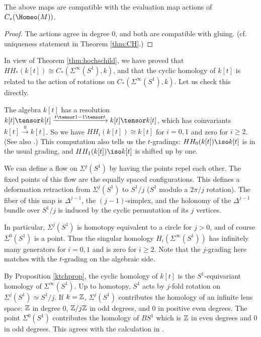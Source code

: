 \begin{prop} \label{ktchprop}
The above maps are compatible with the evaluation map actions of $C_*(\Homeo(M))$.
\end{prop}

\begin{proof}
The actions agree in degree 0, and both are compatible with gluing.
(cf. uniqueness statement in Theorem \ref{thm:CH}.)
\end{proof}

\medskip

In view of Theorem \ref{thm:hochschild}, we have proved that $HH_*(k[t]) \cong C_*(\Sigma^\infty(S^1), k)$,
and that the cyclic homology of $k[t]$ is related to the action of rotations
on $C_*(\Sigma^\infty(S^1), k)$.
Let us check this directly.

The algebra $k[t]$ has a resolution 
$k[t] \tensor k[t] \xrightarrow{t\tensor 1 - 1 \tensor t} k[t] \tensor k[t]$, 
which has coinvariants $k[t] \xrightarrow{0} k[t]$. 
So we have $HH_i(k[t]) \cong k[t]$ for $i=0,1$ and zero for $i\ge 2$.
(See also  \cite[3.2.2]{MR1600246}.) This computation also tells us the $t$-gradings: 
$HH_0(k[t]) \iso k[t]$ is in the usual grading, and $HH_1(k[t]) \iso k[t]$ is shifted up by one.

We can define a flow on $\Sigma^j(S^1)$ by having the points repel each other.
The fixed points of this flow are the equally spaced configurations.
This defines a deformation retraction from $\Sigma^j(S^1)$ to $S^1/j$ ($S^1$ modulo a $2\pi/j$ rotation).
The fiber of this map is $\Delta^{j-1}$, the $(j-1)$-simplex, 
and the holonomy of the $\Delta^{j-1}$ bundle
over $S^1/j$ is induced by the cyclic permutation of its $j$ vertices.

In particular, $\Sigma^j(S^1)$ is homotopy equivalent to a circle for $j>0$, and
of course $\Sigma^0(S^1)$ is a point.
Thus the singular homology $H_i(\Sigma^\infty(S^1))$ has infinitely many generators for $i=0,1$
and is zero for $i\ge 2$.
Note that the $j$-grading here matches with the $t$-grading on the algebraic side.

By Proposition \ref{ktchprop}, 
the cyclic homology of $k[t]$ is the $S^1$-equivariant homology of $\Sigma^\infty(S^1)$.
Up to homotopy, $S^1$ acts by $j$-fold rotation on $\Sigma^j(S^1) \simeq S^1/j$.
If $k = \mathbb{Z}$, $\Sigma^j(S^1)$ contributes the homology of an infinite lens space: $\mathbb{Z}$ in degree
0, $\mathbb{Z}/j \mathbb{Z}$ in odd degrees, and 0 in positive even degrees.
The point $\Sigma^0(S^1)$ contributes the homology of $BS^1$ which is $\mathbb{Z}$ in even 
degrees and 0 in odd degrees.
This agrees with the calculation in \cite[3.1.7]{MR1600246}.

